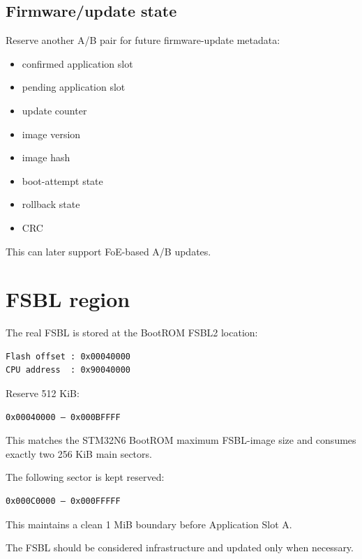 \documentclass[10pt,a4paper,oneside]{report}
\providecommand{\tightlist}{\setlength{\itemsep}{1pt}\setlength{\parskip}{1pt}}
\begin{document}
\subsection{Firmware/update state}\label{wiki-reference-flash-layout-proposal--firmwareupdate-state}

Reserve another A/B pair for future firmware-update metadata:

\begin{itemize}
\tightlist
\item
  confirmed application slot
\item
  pending application slot
\item
  update counter
\item
  image version
\item
  image hash
\item
  boot-attempt state
\item
  rollback state
\item
  CRC
\end{itemize}

This can later support FoE-based A/B updates.

\section{FSBL region}\label{wiki-reference-flash-layout-proposal--6-fsbl-region}

The real FSBL is stored at the BootROM FSBL2 location:

\begin{verbatim}
Flash offset : 0x00040000
CPU address  : 0x90040000
\end{verbatim}

Reserve 512 KiB:

\begin{verbatim}
0x00040000 – 0x000BFFFF
\end{verbatim}

This matches the STM32N6 BootROM maximum FSBL-image size and consumes exactly two 256 KiB main sectors.

The following sector is kept reserved:

\begin{verbatim}
0x000C0000 – 0x000FFFFF
\end{verbatim}

This maintains a clean 1 MiB boundary before Application Slot A.

The FSBL should be considered infrastructure and updated only when necessary.
\end{document}
